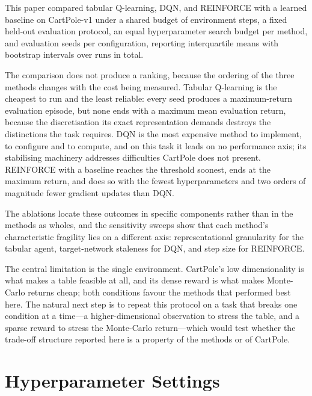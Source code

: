 \documentclass[conference]{IEEEtran}
\begin{document}
This paper compared tabular Q-learning, DQN, and REINFORCE with a learned
baseline on CartPole-v1 under a shared budget of \StepBudget{} environment steps,
a fixed held-out evaluation protocol, an equal hyperparameter search budget per
method, and \NumSeeds{} evaluation seeds per configuration, reporting
interquartile means with bootstrap intervals over \NumRunsTotal{} runs in total.

The comparison does not produce a ranking, because the ordering of the three
methods changes with the cost being measured. Tabular Q-learning is the cheapest
to run and the least reliable: every seed produces a maximum-return evaluation
episode, but none ends with a maximum mean evaluation return, because the discretisation its exact representation demands destroys
the distinctions the task requires. DQN is the most expensive method to implement,
to configure and to compute, and on this task it leads on no performance axis;
its stabilising machinery addresses difficulties CartPole does not present.
REINFORCE with a baseline reaches the threshold soonest, ends at the maximum
return, and does so with the fewest hyperparameters and two orders of magnitude
fewer gradient updates than DQN.

The ablations locate these outcomes in specific components rather than in the
methods as wholes, and the sensitivity sweeps show that each method's
characteristic fragility lies on a different axis: representational granularity
for the tabular agent, target-network staleness for DQN, and step size for
REINFORCE.

The central limitation is the single environment. CartPole's low dimensionality
is what makes a table feasible at all, and its dense reward is what makes
Monte-Carlo returns cheap; both conditions favour the methods that performed best
here. The natural next step is to repeat this protocol on a task that breaks one
condition at a time---a higher-dimensional observation to stress the table, and a
sparse reward to stress the Monte-Carlo return---which would test whether the
trade-off structure reported here is a property of the methods or of CartPole.




\appendices
\section{Hyperparameter Settings}

\end{document}

